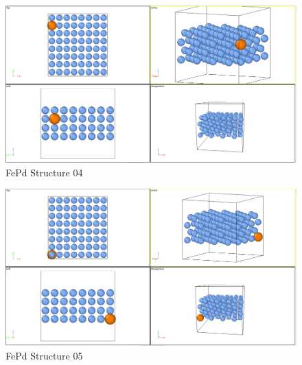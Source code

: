 \begin{figure}[htb]
\centering
\includegraphics[width=.85\linewidth]{appendix/fepd_feru_configurations/fepd/fepdslab1.png}   
\caption{FePd Structure 04}
\label{fig:fepd04}
\end{figure}

\begin{figure}[htb]
\centering
\includegraphics[width=.85\linewidth]{appendix/fepd_feru_configurations/fepd/fepdslab2.png}   
\caption{FePd Structure 05}
\label{fig:fepd05}
\end{figure}









